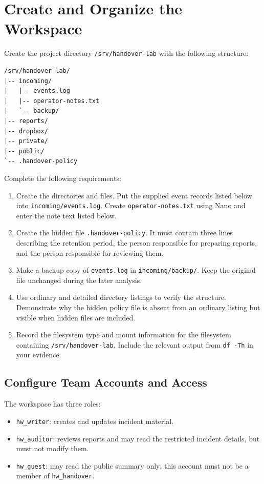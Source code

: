 \section{Create and Organize the Workspace}

Create the project directory \texttt{/srv/handover-lab} with the following structure:

\begin{lstlisting}[language=Terminal]
/srv/handover-lab/
|-- incoming/
|   |-- events.log
|   |-- operator-notes.txt
|   `-- backup/
|-- reports/
|-- dropbox/
|-- private/
|-- public/
`-- .handover-policy
\end{lstlisting}

Complete the following requirements:
\begin{enumerate}
    \item Create the directories and files. Put the supplied event records listed below into \texttt{incoming/events.log}. Create \texttt{operator-notes.txt} using Nano and enter the note text listed below.
    \item Create the hidden file \texttt{.handover-policy}. It must contain three lines describing the retention period, the person responsible for preparing reports, and the person responsible for reviewing them.
    \item Make a backup copy of \texttt{events.log} in \texttt{incoming/backup/}. Keep the original file unchanged during the later analysis.
    \item Use ordinary and detailed directory listings to verify the structure. Demonstrate why the hidden policy file is absent from an ordinary listing but visible when hidden files are included.
    \item Record the filesystem type and mount information for the filesystem containing \texttt{/srv/handover-lab}. Include the relevant output from \texttt{df -Th} in your evidence.
\end{enumerate}

\subsection{Configure Team Accounts and Access}

The workspace has three roles:
\begin{itemize}
    \item \texttt{hw\_writer}: creates and updates incident material.
    \item \texttt{hw\_auditor}: reviews reports and may read the restricted incident details, but must not modify them.
    \item \texttt{hw\_guest}: may read the public summary only; this account must not be a member of \texttt{hw\_handover}.
\end{itemize}

